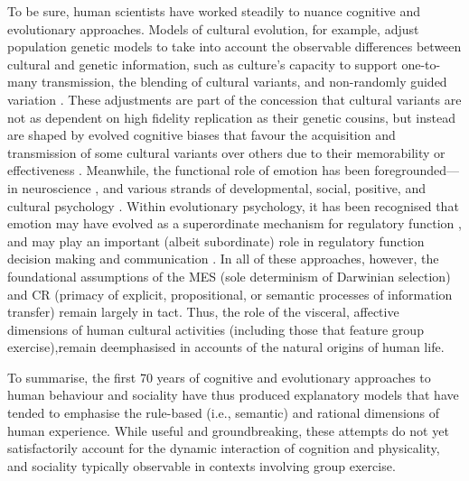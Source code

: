 \begin{CJK}{UTF8}{gbsn}
To be sure, human scientists have worked steadily to nuance cognitive and evolutionary approaches.  Models of cultural evolution, for example, adjust population genetic models to take into account the observable differences between cultural and genetic information, such as culture's capacity to support one-to-many transmission, the blending of cultural variants, and non-randomly guided variation \citep{Cavalli-Sforza1981,Boyd1988}.  These adjustments are part of the concession that cultural variants are not as dependent on high fidelity replication as their genetic cousins, but instead are shaped by evolved cognitive biases that favour the acquisition and transmission of some cultural variants over others due to their memorability or effectiveness \citep{Henrich2007}.  Meanwhile, the functional role of emotion has been foregrounded---in neuroscience \citep{Damasio1994}, and various strands of developmental, social, positive, and cultural psychology \citep{}. Within evolutionary psychology, it has been recognised that emotion may have evolved as a superordinate mechanism for regulatory function \citep{Cosmides2000}, and may play an important (albeit subordinate) role in regulatory function  decision making \citep{Dalgleish2004} and communication \citep{Rime2009}.  In all of these approaches, however, the foundational assumptions of the MES (sole determinism of Darwinian selection) and CR (primacy of explicit, propositional, or semantic processes of information transfer) remain largely in tact.  Thus, the role of the visceral, affective dimensions of human cultural activities (including those that feature group exercise),remain deemphasised in accounts of the natural origins of human life.

To summarise, the first 70 years of cognitive and evolutionary approaches to human behaviour and sociality have thus produced explanatory models that have tended to emphasise the rule-based (i.e., semantic) and rational dimensions of human experience.  While useful and groundbreaking, these attempts do not yet satisfactorily account for the dynamic interaction of cognition and physicality, and sociality typically observable in contexts involving group exercise.



\end{CJK}
